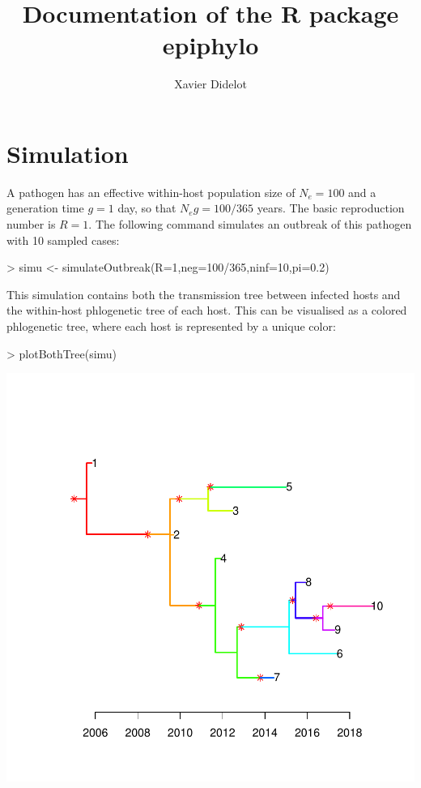 \documentclass[a4paper]{article}
\title{Documentation of the R package epiphylo}
\author{Xavier Didelot}
\begin{document}


\maketitle


\section{Simulation}

A pathogen has an effective within-host population size of $N_e=100$ and a generation time $g=1$ day, so that $N_e g=100/365$ years. The basic reproduction number is $R=1$. The following command simulates an outbreak of this pathogen with 10 sampled cases: 
\begin{Schunk}
\begin{Sinput}
> simu <- simulateOutbreak(R=1,neg=100/365,ninf=10,pi=0.2)
\end{Sinput}
\end{Schunk}

This simulation contains both the transmission tree between infected hosts and the within-host phlogenetic tree of each host. This can be visualised as a colored phlogenetic tree, where each host is represented by a unique color:

\begin{center}
\begin{Schunk}
\begin{Sinput}
> plotBothTree(simu)
\end{Sinput}
\end{Schunk}
\includegraphics{epiphylo-003}
\end{center}
\end{document}
